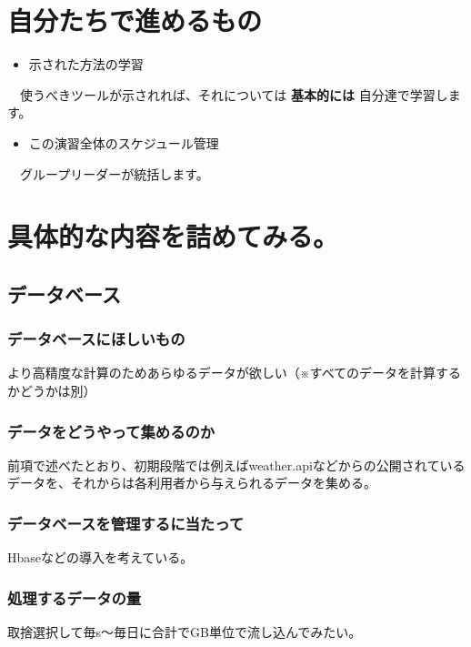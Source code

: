 \documentclass{scrartcl}
\begin{document}
\section{自分たちで進めるもの}
\label{sec:org31310e6}
\begin{itemize}
\item 示された方法の学習\\
\end{itemize}
　使うべきツールが示されれば、それについては \textbf{基本的には} 自分達で学習します。\\
\begin{itemize}
\item この演習全体のスケジュール管理\\
\end{itemize}
　グループリーダーが統括します。\\
\section{具体的な内容を詰めてみる。}
\label{sec:org39fd6bd}
\subsection{データベース}
\label{sec:org816d8fb}
\subsubsection{データベースにほしいもの}
\label{sec:org01dab1f}
より高精度な計算のためあらゆるデータが欲しい（※すべてのデータを計算するかどうかは別）\\
\subsubsection{データをどうやって集めるのか}
\label{sec:orgc424ed6}
前項で述べたとおり、初期段階では例えばweather.apiなどからの公開されているデータを、それからは各利用者から与えられるデータを集める。\\
\subsubsection{データベースを管理するに当たって}
\label{sec:org1cbd293}
Hbaseなどの導入を考えている。\\
\subsubsection{処理するデータの量}
\label{sec:org7e9df78}
取捨選択して毎s〜毎日に合計でGB単位で流し込んでみたい。\\
\end{document}
